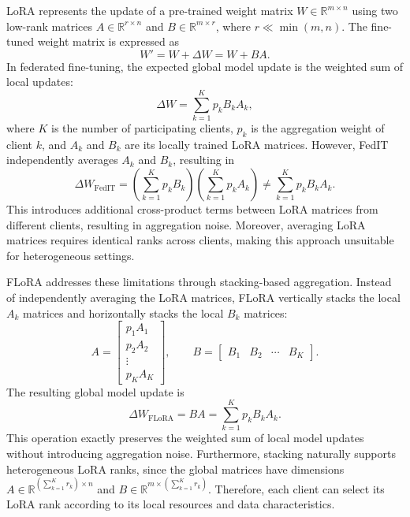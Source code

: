 \documentclass[11pt]{article}
\begin{document}
LoRA represents the update of a pre-trained weight matrix $W \in \mathbb{R}^{m \times n}$ using two low-rank matrices $A \in \mathbb{R}^{r \times n}$ and $B \in \mathbb{R}^{m \times r}$, where $r \ll \min(m,n)$. The fine-tuned weight matrix is expressed as
\begin{equation}
W' = W + \Delta W = W + BA.
\label{eq:flora_lora}
\end{equation}
In federated fine-tuning, the expected global model update is the weighted sum of local updates:
\begin{equation}
\Delta W = \sum_{k=1}^{K} p_k B_k A_k,
\label{eq:flora_expected}
\end{equation}
where $K$ is the number of participating clients, $p_k$ is the aggregation weight of client $k$, and $A_k$ and $B_k$ are its locally trained LoRA matrices. However, FedIT independently averages $A_k$ and $B_k$, resulting in
\begin{equation}
\Delta W_{\mathrm{FedIT}} = \left(\sum_{k=1}^{K} p_k B_k\right)\left(\sum_{k=1}^{K} p_k A_k\right) \neq \sum_{k=1}^{K} p_k B_k A_k.
\label{eq:flora_noise}
\end{equation}
This introduces additional cross-product terms between LoRA matrices from different clients, resulting in aggregation noise. Moreover, averaging LoRA matrices requires identical ranks across clients, making this approach unsuitable for heterogeneous settings.

FLoRA addresses these limitations through stacking-based aggregation. Instead of independently averaging the LoRA matrices, FLoRA vertically stacks the local $A_k$ matrices and horizontally stacks the local $B_k$ matrices:
\begin{equation}
A = \begin{bmatrix} p_1 A_1 \\ p_2 A_2 \\ \vdots \\ p_K A_K \end{bmatrix}, \qquad B = \begin{bmatrix} B_1 & B_2 & \cdots & B_K \end{bmatrix}.
\label{eq:flora_stacking}
\end{equation}
The resulting global model update is
\begin{equation}
\Delta W_{\mathrm{FLoRA}} = BA = \sum_{k=1}^{K} p_k B_k A_k.
\label{eq:flora_correct}
\end{equation}
This operation exactly preserves the weighted sum of local model updates without introducing aggregation noise. Furthermore, stacking naturally supports heterogeneous LoRA ranks, since the global matrices have dimensions $A \in \mathbb{R}^{(\sum_{k=1}^{K}r_k) \times n}$ and $B \in \mathbb{R}^{m \times (\sum_{k=1}^{K}r_k)}$. Therefore, each client can select its LoRA rank according to its local resources and data characteristics.
\end{document}
